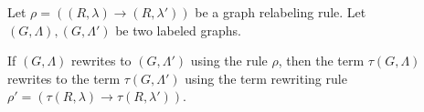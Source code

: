      

\begin{lemma}
\label{grs_to_trs_step}
Let $\rho \mathop{=} ((R,\lambda) \mathop{\to} (R,\lambda'))$ be a graph relabeling rule. 
Let $(G, \Lambda), (G,\Lambda')$ be two labeled graphs.

If $(G, \Lambda)$ rewrites to $(G, \Lambda')$ using the rule $\rho$, then the term $\tau(G,\Lambda)$ rewrites to the term $\tau(G,\Lambda')$ using the term rewriting rule $\rho' \mathop{=} (\tau(R,\lambda) \mathop{\to} \tau(R,\lambda'))$.
\end{lemma}

